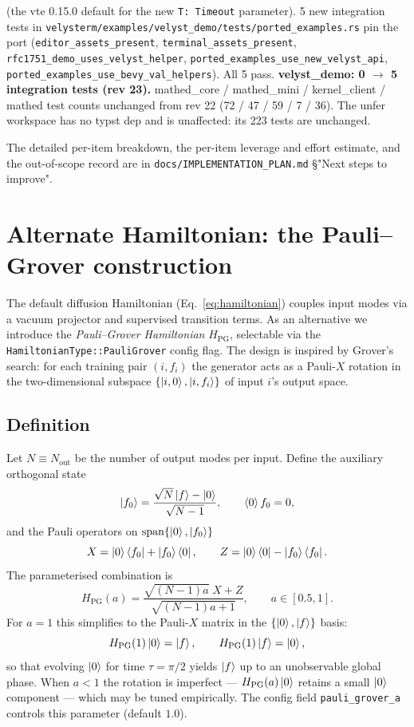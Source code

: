 \documentclass[11pt, a4paper]{article}
\begin{document}
\begin{enumerate}
  (the vte 0.15.0 default for the new \texttt{T: Timeout}
  parameter). 5 new integration tests in
  \texttt{velysterm/examples/velyst\_demo/tests/ported\_examples.rs}
  pin the port (\texttt{editor\_assets\_present},
  \texttt{terminal\_assets\_present},
  \texttt{rfc1751\_demo\_uses\_velyst\_helper},
  \texttt{ported\_examples\_use\_new\_velyst\_api},
  \texttt{ported\_examples\_use\_bevy\_val\_helpers}). All 5 pass.
  \textbf{velyst\_demo: 0 $\to$ 5 integration tests (rev 23).}
  mathed\_core / mathed\_mini / kernel\_client / mathed test
  counts unchanged from rev 22 (72 / 47 / 59 / 7 / 36). The
  unfer workspace has no typst dep and is unaffected: its
  223 tests are unchanged.
\end{enumerate}

The detailed per-item breakdown, the per-item leverage and
effort estimate, and the out-of-scope record are in
\texttt{docs/IMPLEMENTATION\_PLAN.md} \S"Next steps to improve".

\section{Alternate Hamiltonian: the Pauli--Grover construction}

\label{sec:pauli-grover}

The default diffusion Hamiltonian (Eq.~\ref{eq:hamiltonian}) couples input
modes via a vacuum projector and supervised transition terms.  As an
alternative we introduce the \emph{Pauli--Grover Hamiltonian}
$H_{\mathrm{PG}}$, selectable via the
\texttt{HamiltonianType::PauliGrover} config flag.  The design is inspired
by Grover's search: for each training pair $(i,f_i)$ the generator acts as a
Pauli-$X$ rotation in the two-dimensional subspace
$\{\ket{i,0},\ket{i,f_i}\}$ of input $i$'s output space.

\subsection{Definition}

Let $N\equiv N_{\mathrm{out}}$ be the number of output modes per input.
Define the auxiliary orthogonal state
\[
\ket{f_0} = \frac{\sqrt{N}\ket{f} - \ket{0}}{\sqrt{N-1}},
\qquad \braket{0}{f_0}=0,
\]
and the Pauli operators on $\operatorname{span}\{\ket{0},\ket{f_0}\}$
\[
X = \ket{0}\bra{f_0} + \ket{f_0}\bra{0},\qquad
Z = \ket{0}\bra{0} - \ket{f_0}\bra{f_0}.
\]
The parameterised combination is
\[
H_{\mathrm{PG}}(a)
= \frac{\sqrt{(N-1)a}\;X + Z}{\sqrt{(N-1)a+1}},
\qquad a\in[0.5,1].
\]
For $a=1$ this simplifies to the Pauli-$X$ matrix in the
$\{\ket{0},\ket{f}\}$ basis:
\[
H_{\mathrm{PG}}(1)\ket{0} = \ket{f},\qquad
H_{\mathrm{PG}}(1)\ket{f} = \ket{0},
\]
so that evolving $\ket{0}$ for time $\tau=\pi/2$ yields $\ket{f}$ up to an
unobservable global phase.  When $a<1$ the rotation is imperfect —
$H_{\mathrm{PG}}(a)\ket{0}$ retains a small $\ket{0}$ component — which may
be tuned empirically.  The config field \texttt{pauli\_grover\_a} controls
this parameter (default $1.0$).
\end{document}
